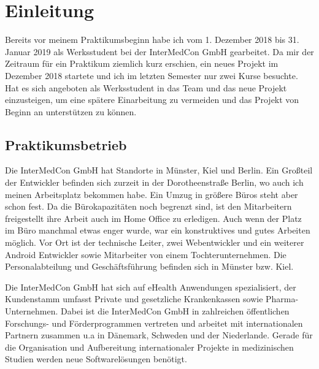 \chapter{Einleitung}\label{einleitung}
Bereits vor meinem Praktikumsbeginn habe ich vom 1. Dezember 2018 bis 31. Januar 2019 als Werksstudent bei der InterMedCon GmbH gearbeitet. Da mir der Zeitraum für ein Praktikum ziemlich kurz erschien, ein neues Projekt im Dezember 2018 startete und ich im letzten Semester nur zwei Kurse besuchte. Hat es sich angeboten als Werksstudent in das Team und das neue Projekt einzusteigen, um eine spätere Einarbeitung zu vermeiden und das Projekt von Beginn an unterstützen zu können. 
\section{Praktikumsbetrieb}
Die InterMedCon GmbH hat Standorte in Münster, Kiel und Berlin. Ein Großteil der Entwickler befinden sich zurzeit in der Dorotheenstraße Berlin, wo auch ich meinen Arbeitsplatz bekommen habe. Ein Umzug in größere Büros steht aber schon fest. Da die Bürokapazitäten noch begrenzt sind, ist den Mitarbeitern freigestellt ihre Arbeit auch im Home Office zu erledigen. Auch wenn der Platz im Büro manchmal etwas enger wurde, war ein konstruktives und gutes Arbeiten möglich. Vor Ort ist der technische Leiter, zwei Webentwickler und ein weiterer Android Entwickler sowie Mitarbeiter von einem Tochterunternehmen. Die Personalabteilung und Geschäftsführung befinden sich in Münster bzw. Kiel. 

Die InterMedCon GmbH hat sich auf eHealth Anwendungen spezialisiert, der Kundenstamm umfasst Private und gesetzliche Krankenkassen sowie Pharma-Unternehmen. Dabei ist die InterMedCon GmbH in zahlreichen öffentlichen Forschungs- und Förderprogrammen vertreten und arbeitet mit internationalen Partnern zusammen u.a in Dänemark, Schweden und der Niederlande. Gerade für die Organisation und Aufbereitung internationaler Projekte in medizinischen Studien werden neue Softwarelösungen benötigt. 




